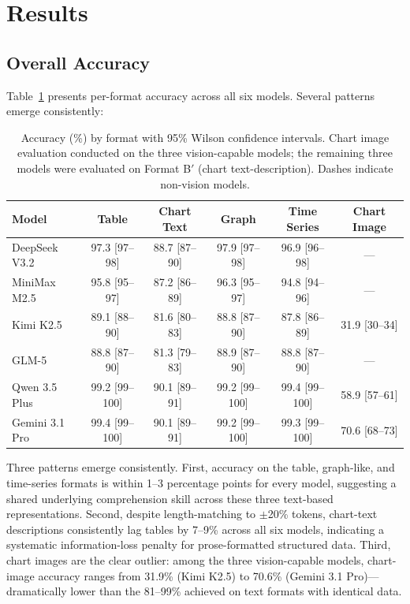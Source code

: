 \documentclass[11pt]{article}
\begin{document}
\section{Results}

\subsection{Overall Accuracy}

Table~\ref{tab:accuracy} presents per-format accuracy across all six models. Several patterns emerge consistently:

\begin{table}[t]
\centering
\small
\begin{tabular}{lccccc}
\toprule
\textbf{Model} & \textbf{Table} & \textbf{Chart Text} & \textbf{Graph} & \textbf{Time Series} & \textbf{Chart Image} \\
\midrule
DeepSeek V3.2 & 97.3 {\scriptsize[97--98]} & 88.7 {\scriptsize[87--90]} & 97.9 {\scriptsize[97--98]} & 96.9 {\scriptsize[96--98]} & --- \\
MiniMax M2.5 & 95.8 {\scriptsize[95--97]} & 87.2 {\scriptsize[86--89]} & 96.3 {\scriptsize[95--97]} & 94.8 {\scriptsize[94--96]} & --- \\
Kimi K2.5 & 89.1 {\scriptsize[88--90]} & 81.6 {\scriptsize[80--83]} & 88.8 {\scriptsize[87--90]} & 87.8 {\scriptsize[86--89]} & 31.9 {\scriptsize[30--34]} \\
GLM-5 & 88.8 {\scriptsize[87--90]} & 81.3 {\scriptsize[79--83]} & 88.9 {\scriptsize[87--90]} & 88.8 {\scriptsize[87--90]} & --- \\
Qwen 3.5 Plus & 99.2 {\scriptsize[99--100]} & 90.1 {\scriptsize[89--91]} & 99.2 {\scriptsize[99--100]} & 99.4 {\scriptsize[99--100]} & 58.9 {\scriptsize[57--61]} \\
Gemini 3.1 Pro & 99.4 {\scriptsize[99--100]} & 90.1 {\scriptsize[89--91]} & 99.2 {\scriptsize[99--100]} & 99.3 {\scriptsize[99--100]} & 70.6 {\scriptsize[68--73]} \\
\bottomrule
\end{tabular}
\caption{Accuracy (\%) by format with 95\% Wilson confidence intervals. Chart image evaluation conducted on the three vision-capable models; the remaining three models were evaluated on Format B$'$ (chart text-description). Dashes indicate non-vision models.}
\label{tab:accuracy}
\end{table}

Three patterns emerge consistently. First, accuracy on the table, graph-like, and time-series formats is within 1--3 percentage points for every model, suggesting a shared underlying comprehension skill across these three text-based representations. Second, despite length-matching to $\pm$20\% tokens, chart-text descriptions consistently lag tables by 7--9\% across all six models, indicating a systematic information-loss penalty for prose-formatted structured data. Third, chart images are the clear outlier: among the three vision-capable models, chart-image accuracy ranges from 31.9\% (Kimi K2.5) to 70.6\% (Gemini 3.1 Pro)---dramatically lower than the 81--99\% achieved on text formats with identical data.
\end{document}
